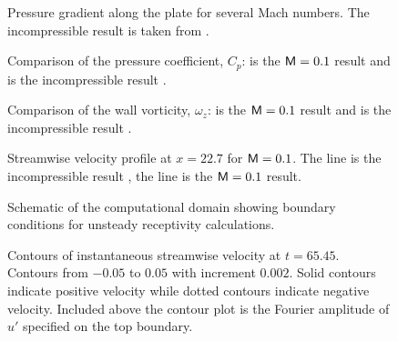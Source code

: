 %
%
\begin{figure}[p]
\centering
{}
\epsfxsize=5.0in 
\caption[Pressure gradient along the plate for several Mach numbers.]{Pressure gradient along the plate for several Mach numbers.  The
incompressible result is taken from \protect\cite{Lin:92}.
\label{dpds} }
\end{figure}
%
\begin{figure}[p]
\centering
{}
\epsfxsize=5.0in 
\caption [Comparison of the pressure coefficient]{Comparison of the pressure
coefficient, $C_p$: \solid is the $\M=0.1$ result and \dashed is the
incompressible result \protect\cite{Lin:92}.
\label{f:cp} }
\end{figure}
%
\begin{figure}[p]
\centering
{}
\epsfxsize=5.0in 
\caption [Comparison of the wall vorticity] {Comparison of the wall vorticity,
$\omega_z$: \solid is the $\M=0.1$ result and \dashed is the incompressible
result \protect\cite{Lin:92}.
\label{f:omega} }
\end{figure}
%
\begin{figure}[p]
\centering
{} 
\epsfxsize=3.0in 
\caption [Streamwise velocity profile at $x=22.7$ for $\M=0.1$]{Streamwise
velocity profile at $x=22.7$ for $\M=0.1$. The \solid line is the
incompressible result \protect\cite{Lin:92}, the \ldashed line is the $\M=0.1$
result. \label{profile} }
\end{figure}
%
%
\begin{figure}[p]
\centering
\epsfxsize=5.0in 
\caption [Schematic of the computational domain]{Schematic of the
computational domain showing boundary conditions for unsteady receptivity
calculations. \label{schematic} }
\end{figure}
%
\begin{figure}[p]
\centering
\epsfxsize=5.0in 
\caption [Contours of instantaneous streamwise velocity at
$t=65.45$.]{Contours of instantaneous streamwise velocity at $t=65.45$.
Contours from $-0.05$ to $0.05$ with increment $0.002$.  Solid contours
indicate positive velocity while dotted contours indicate negative velocity.
Included above the contour plot is the Fourier amplitude of $u'$ specified on
the top boundary. \label{uprime} }
\end{figure}
